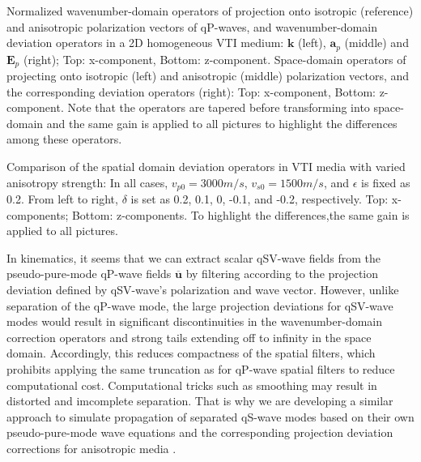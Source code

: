 {
Normalized wavenumber-domain operators of projection onto isotropic (reference) and anisotropic
 polarization vectors of qP-waves, and wavenumber-domain deviation operators in a 2D homogeneous VTI medium: 
$\mathbf{k}$ (left), $\mathbf{a}_{p}$ (middle) and $\mathbf{E}_{p}$ (right);
 Top: x-component, Bottom: z-component.
}
{
Space-domain operators of projecting onto isotropic (left) and anisotropic (middle) polarization vectors, and
the corresponding deviation operators (right): Top: x-component, Bottom: z-component.
Note that the operators are tapered before transforming into space-domain and the same
gain is applied to all pictures to highlight the differences among these operators.
}


{Comparison of the spatial domain deviation operators in VTI media with varied anisotropy strength:
In all cases, $v_{p0}=3000m/s$, $v_{s0}=1500m/s$, and $\epsilon$ is fixed as 0.2.
From left to right, $\delta$ is set as 0.2, 0.1, 0, -0.1, and -0.2, respectively. Top: x-components;
 Bottom: z-components. To highlight the differences,the same gain is applied to all pictures.}

In kinematics, it seems that we can extract scalar qSV-wave fields from the pseudo-pure-mode qP-wave fields
 $\overline{\mathbf{u}}$ by filtering according to the projection deviation defined by qSV-wave's polarization
and wave vector. However, unlike separation of the qP-wave mode, the large projection deviations for
 qSV-wave modes would result in significant discontinuities in the wavenumber-domain correction operators and
 strong tails extending off to infinity in the space domain. Accordingly, this reduces compactness
of the spatial filters, which prohibits applying the same truncation as for qP-wave spatial filters to
 reduce computational cost. Computational tricks such as smoothing may result in distorted and imcomplete separation.
That is why we are developing a similar approach to simulate propagation 
of separated qS-wave modes based on their own pseudo-pure-mode wave equations and the corresponding
projection deviation corrections for anisotropic media \cite[]{kang.cheng:2012}.
